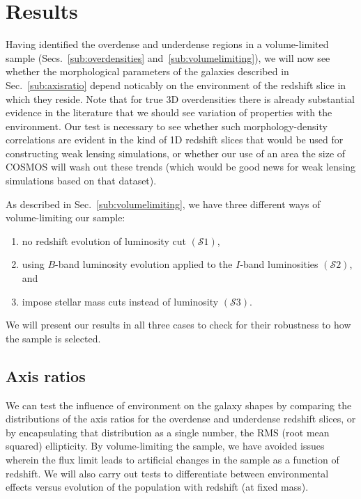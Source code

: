 \documentclass[twocolumn,useAMS,usenatbib]{mn2e}
\newcommand{\s}{\ensuremath{\mathcal{S}}}
\begin{document}
\section{Results}
\label{S:results}

Having identified the overdense and underdense regions in a
volume-limited sample (Secs.~\ref{sub:overdensities}
and~\ref{sub:volumelimiting}), we will now see whether the morphological
parameters of the galaxies described in Sec.~\ref{sub:axisratio}
depend noticably on the environment of the redshift slice in which
they reside. Note that for true 3D overdensities there is already
substantial evidence in the literature that we should see variation of
properties with the environment.  Our test is necessary to see
whether such morphology-density correlations are evident in the kind
of 1D redshift slices that would be used for constructing weak lensing
simulations, or whether our use of an area the size of COSMOS will
wash out these trends (which would be good news for weak lensing
simulations based on that dataset).

As described in Sec.~\ref{sub:volumelimiting}, we have three different ways of volume-limiting our sample:
\begin{enumerate}
 \item no redshift evolution of luminosity cut $(\s1)$,
 \item using $B$-band luminosity evolution applied to the $I$-band
   luminosities $(\s2)$, and
 \item impose stellar mass cuts instead of luminosity $(\s3)$.
\end{enumerate}

We will present our results in all three cases to check for their
robustness to how the sample is selected. 

\subsection{Axis ratios} 

We can test the influence of environment on the galaxy shapes by
comparing the distributions of the axis ratios for the overdense and
underdense redshift slices, or by encapsulating that distribution as a
single number, the RMS (root mean squared) ellipticity. By
volume-limiting the sample, we have avoided issues
wherein the flux limit leads to artificial changes in the sample as a
function of redshift.  We will also carry out tests to differentiate
between environmental effects versus evolution of the population with
redshift (at fixed mass).
\end{document}
